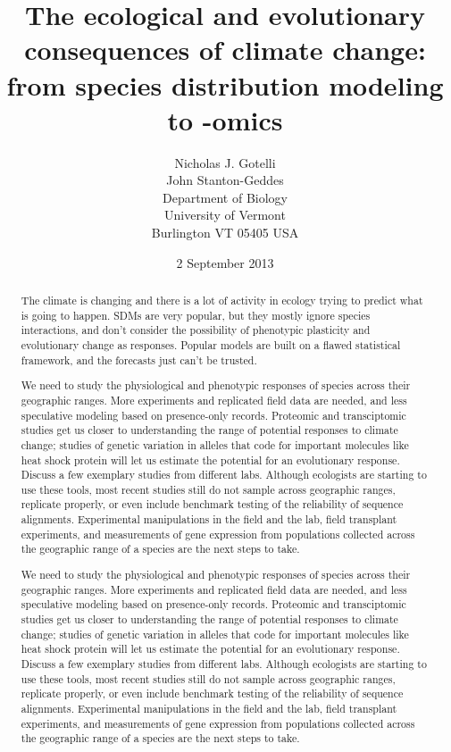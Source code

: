 \documentclass{article}
\author{Nicholas J. Gotelli\\
        John Stanton-Geddes\\
        Department of Biology\\
        University of Vermont\\
        Burlington VT 05405 USA}
\title{The ecological and evolutionary consequences of climate change: from species distribution modeling to -omics}
\date{2 September 2013} %
\begin{document}
\maketitle
\begin{abstract}
The climate is changing and there is a lot of activity in ecology trying to predict what is going to happen. SDMs are very popular, but they mostly ignore species interactions, and don't consider the possibility of phenotypic plasticity and evolutionary change as responses. Popular models are built on a flawed statistical framework, and the forecasts just can't be trusted.

We need to study the physiological and phenotypic responses of species across their geographic ranges. More experiments and replicated field data are needed, and less speculative modeling based on presence-only records. Proteomic and transciptomic studies get us closer to understanding the range of  potential responses to climate change; studies of genetic variation in alleles that code for important molecules like heat shock protein will let us estimate the potential for an evolutionary response. Discuss a few exemplary studies from different labs. Although ecologists are starting to use these tools, most recent studies still do not sample across geographic ranges, replicate properly, or even include benchmark testing of the reliability of sequence alignments. Experimental manipulations in the field and the lab, field transplant experiments, and measurements of gene expression from populations collected across the geographic range of a species are the next steps to take.

We need to study the physiological and phenotypic responses of species across their geographic ranges. More experiments and replicated field data are needed, and less speculative modeling based on presence-only records. Proteomic and transciptomic studies get us closer to understanding the range of  potential responses to climate change; studies of genetic variation in alleles that code for important molecules like heat shock protein will let us estimate the potential for an evolutionary response. Discuss a few exemplary studies from different labs. Although ecologists are starting to use these tools, most recent studies still do not sample across geographic ranges, replicate properly, or even include benchmark testing of the reliability of sequence alignments. Experimental manipulations in the field and the lab, field transplant experiments, and measurements of gene expression from populations collected across the geographic range of a species are the next steps to take. 


\end{abstract}
\end{document}
